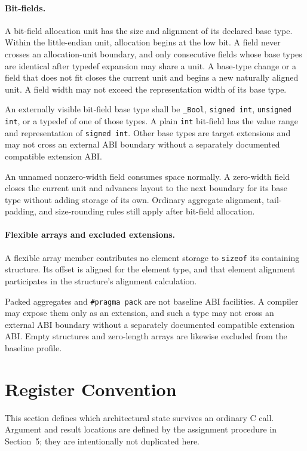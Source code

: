 \documentclass[10pt,twoside]{article}
\begin{document}
\paragraph{Bit-fields.}
A bit-field allocation unit has the size and alignment of its declared base
type. Within the little-endian unit, allocation begins at the low bit. A field
never crosses an allocation-unit boundary, and only consecutive fields whose
base types are identical after typedef expansion may share a unit. A base-type
change or a field that does not fit closes the current unit and begins a new
naturally aligned unit. A field width may not exceed the representation width
of its base type.

An externally visible bit-field base type shall be \texttt{\_Bool},
\texttt{signed int}, \texttt{unsigned int}, or a typedef of one of those types.
A plain \texttt{int} bit-field has the value range and representation of
\texttt{signed int}. Other base types are target extensions and may not cross
an external ABI boundary without a separately documented compatible extension
ABI.

An unnamed nonzero-width field consumes space normally. A zero-width field
closes the current unit and advances layout to the next boundary for its base
type without adding storage of its own. Ordinary aggregate alignment,
tail-padding, and size-rounding rules still apply after bit-field allocation.

\paragraph{Flexible arrays and excluded extensions.}
A flexible array member contributes no element storage to \texttt{sizeof} its
containing structure. Its offset is aligned for the element type, and that
element alignment participates in the structure's alignment calculation.

Packed aggregates and \texttt{\#pragma pack} are not baseline ABI facilities.
A compiler may expose them only as an extension, and such a type may not cross
an external ABI boundary without a separately documented compatible extension
ABI. Empty structures and zero-length arrays are likewise excluded from the
baseline profile.

\section{Register Convention}\label{page:register-convention}
This section defines which architectural state survives an ordinary C call.
Argument and result locations are defined by the assignment procedure in
Section~5; they are intentionally not duplicated here.
\end{document}
